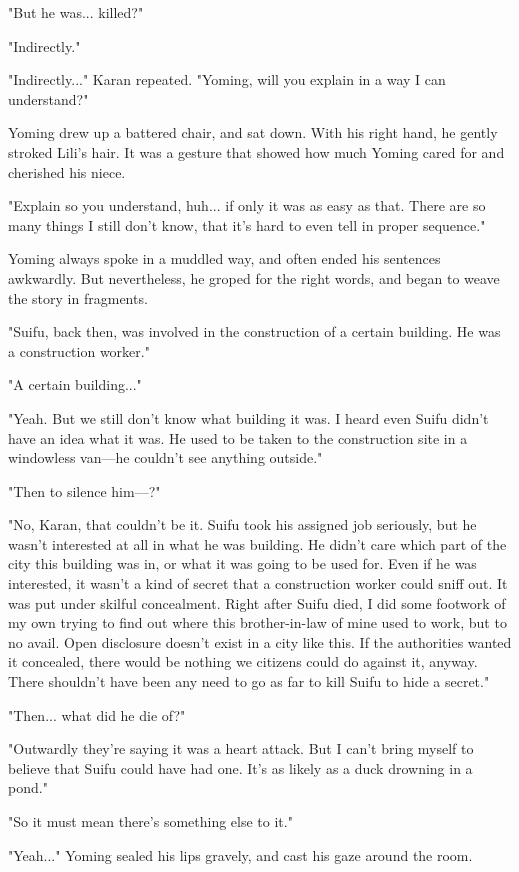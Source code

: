 "But he was... killed?"

"Indirectly."

"Indirectly..." Karan repeated. "Yoming, will you explain in a way I can
understand?"

Yoming drew up a battered chair, and sat down. With his right hand, he
gently stroked Lili's hair. It was a gesture that showed how much Yoming
cared for and cherished his niece.

"Explain so you understand, huh... if only it was as easy as that. There
are so many things I still don't know, that it's hard to even tell in
proper sequence."

Yoming always spoke in a muddled way, and often ended his sentences
awkwardly. But nevertheless, he groped for the right words, and began to
weave the story in fragments.

"Suifu, back then, was involved in the construction of a certain
building. He was a construction worker."

"A certain building..."

"Yeah. But we still don't know what building it was. I heard even Suifu
didn't have an idea what it was. He used to be taken to the construction
site in a windowless van---he couldn't see anything outside."

"Then to silence him---?"

"No, Karan, that couldn't be it. Suifu took his assigned job seriously,
but he wasn't interested at all in what he was building. He didn't care
which part of the city this building was in, or what it was going to be
used for. Even if he was interested, it wasn't a kind of secret that a
construction worker could sniff out. It was put under skilful
concealment. Right after Suifu died, I did some footwork of my own
trying to find out where this brother-in-law of mine used to work, but
to no avail. Open disclosure doesn't exist in a city like this. If the
authorities wanted it concealed, there would be nothing we citizens
could do against it, anyway. There shouldn't have been any need to go as
far to kill Suifu to hide a secret."

"Then... what did he die of?"

"Outwardly they're saying it was a heart attack. But I can't bring
myself to believe that Suifu could have had one. It's as likely as a
duck drowning in a pond."

"So it must mean there's something else to it."

"Yeah..." Yoming sealed his lips gravely, and cast his gaze around the
room.

